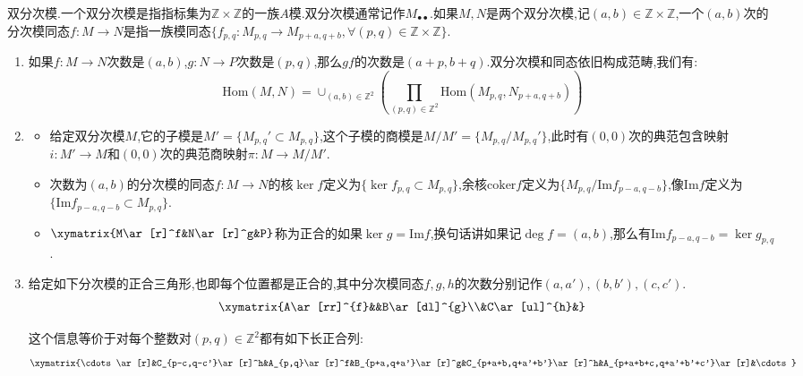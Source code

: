 双分次模.一个双分次模是指指标集为$\mathbb{Z}\times\mathbb{Z}$的一族$A$模.双分次模通常记作$M_{\bullet\bullet}$.如果$M,N$是两个双分次模,记$(a,b)\in\mathbb{Z}\times\mathbb{Z}$,一个$(a,b)$次的分次模同态$f:M\to N$是指一族模同态$\{f_{p,q}:M_{p,q}\to M_{p+a,q+b},\forall(p,q)\in\mathbb{Z}\times\mathbb{Z}\}$.
\begin{enumerate}
	\item 如果$f:M\to N$次数是$(a,b)$,$g:N\to P$次数是$(p,q)$,那么$gf$的次数是$(a+p,b+q)$.双分次模和同态依旧构成范畴,我们有:
	$$\mathrm{Hom}(M,N)=\cup_{(a,b)\in\mathbb{Z}^2}\left(\prod_{(p,q)\in\mathbb{Z}^2}\mathrm{Hom}(M_{p,q},N_{p+a,q+b})\right)$$
	\item 
	\begin{itemize}
		\item 给定双分次模$M$,它的子模是$M'=\{M_{p,q}'\subset M_{p,q}\}$,这个子模的商模是$M/M'=\{M_{p,q}/M_{p,q}'\}$,此时有$(0,0)$次的典范包含映射$i:M'\to M$和$(0,0)$次的典范商映射$\pi:M\to M/M'$.
		\item 次数为$(a,b)$的分次模的同态$f:M\to N$的核$\ker f$定义为$\{\ker f_{p,q}\subset M_{p,q}\}$,余核$\mathrm{coker}f$定义为$\{M_{p,q}/\mathrm{Im}f_{p-a,q-b}\}$,像$\mathrm{Im}f$定义为$\{\mathrm{Im}f_{p-a,q-b}\subset M_{p,q}\}$.
		\item $\xymatrix{M\ar[r]^f&N\ar[r]^g&P}$称为正合的如果$\ker g=\mathrm{Im}f$,换句话讲如果记$\deg f=(a,b)$,那么有$\mathrm{Im}f_{p-a,q-b}=\ker g_{p,q}$.
	\end{itemize}
	\item 给定如下分次模的正合三角形,也即每个位置都是正合的,其中分次模同态$f,g,h$的次数分别记作$(a,a'),(b,b'),(c,c')$.
	$$\xymatrix{A\ar[rr]^{f}&&B\ar[dl]^{g}\\&C\ar[ul]^{h}&}$$
	
	这个信息等价于对每个整数对$(p,q)\in\mathbb{Z}^2$都有如下长正合列:
	$$\xymatrix{\cdots\ar[r]&C_{p-c,q-c'}\ar[r]^h&A_{p,q}\ar[r]^f&B_{p+a,q+a'}\ar[r]^g&C_{p+a+b,q+a'+b'}\ar[r]^h&A_{p+a+b+c,q+a'+b'+c'}\ar[r]&\cdots}$$
\end{enumerate}

